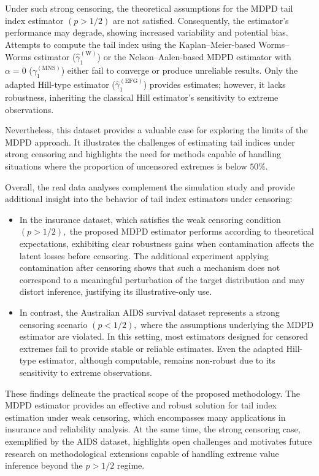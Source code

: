 \documentclass[reqno,openbib,runningheads,a4paper,12pt]{amsart}%
\begin{document}
\noindent Under such strong censoring, the theoretical assumptions for the
MDPD tail index estimator $(p>1/2)$ are not satisfied. Consequently, the
estimator's performance may degrade, showing increased variability and
potential bias. Attempts to compute the tail index using the
Kaplan--Meier-based Worms--Worms estimator ($\widehat{\gamma}_{1}%
^{(\mathrm{W})}$) or the Nelson--Aalen-based MDPD estimator with $\alpha=0$
($\gamma_{1}^{(\mathrm{MNS})}$) either fail to converge or produce unreliable
results. Only the adapted Hill-type estimator ($\widehat{\gamma}%
_{1}^{(\mathrm{EFG})}$) provides estimates; however, it lacks robustness,
inheriting the classical Hill estimator's sensitivity to extreme
observations.\medskip

\noindent Nevertheless, this dataset provides a valuable case for exploring
the limits of the MDPD approach. It illustrates the challenges of estimating
tail indices under strong censoring and highlights the need for methods
capable of handling situations where the proportion of uncensored extremes is
below $50\%$.\medskip

\noindent Overall, the real data analyses complement the simulation study and
provide additional insight into the behavior of tail index estimators under censoring:

\begin{itemize}
\item In the insurance dataset, which satisfies the weak censoring condition
$(p>1/2),$ the proposed MDPD estimator performs according to theoretical
expectations, exhibiting clear robustness gains when contamination affects the
latent losses before censoring. The additional experiment applying
contamination after censoring shows that such a mechanism does not correspond
to a meaningful perturbation of the target distribution and may distort
inference, justifying its illustrative-only use.

\item In contrast, the Australian AIDS survival dataset represents a strong
censoring scenario $(p<1/2),$ where the assumptions underlying the MDPD
estimator are violated. In this setting, most estimators designed for censored
extremes fail to provide stable or reliable estimates. Even the adapted
Hill-type estimator, although computable, remains non-robust due to its
sensitivity to extreme observations.
\end{itemize}

\noindent These findings delineate the practical scope of the proposed
methodology. The MDPD estimator provides an effective and robust solution for
tail index estimation under weak censoring, which encompasses many
applications in insurance and reliability analysis. At the same time, the
strong censoring case, exemplified by the AIDS dataset, highlights open
challenges and motivates future research on methodological extensions capable
of handling extreme value inference beyond the $p>1/2$ regime.
\end{document}
